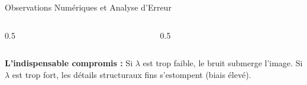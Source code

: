 \begin{frame}{Observations Numériques et Analyse d'Erreur}
    \begin{columns}[c]
        \begin{column}{0.5\textwidth}
            \centering
        \end{column}
        \begin{column}{0.5\textwidth}
            \centering
        \end{column}
    \end{columns}
    \vspace{0.3cm}
    \begin{center}
        \small \textbf{L'indispensable compromis :} Si $\lambda$ est trop faible, le bruit submerge l'image. Si $\lambda$ est trop fort, les détails structuraux fins s'estompent (biais élevé).
    \end{center}
\end{frame}
